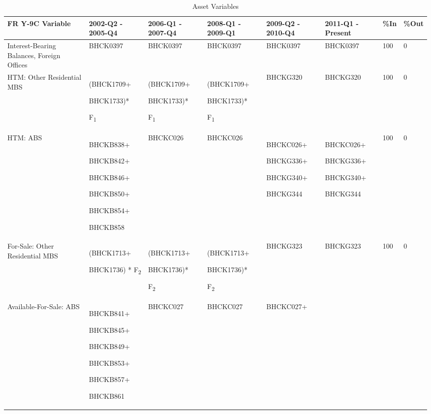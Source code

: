 \begin{landscape} %
\scriptsize
\begin{longtable}{|>{\raggedright}p{3cm}|>{\raggedright}p{2.2cm}|>{\raggedright}p{2.2cm}|>{\raggedright}p{2.2cm}|>{\raggedright}p{2.5cm}|>{\raggedright}p{2.5cm}|>{\raggedright}p{1cm}|>{\raggedright}p{1cm}|}
\caption{Asset Variables}
\label{tab:assets_y9c} \tabularnewline
\hline 
FR Y-9C Variable  & 2002-Q2 - 2005-Q4  & 2006-Q1 - 2007-Q4  & 2008-Q1 - 2009-Q1  & 2009-Q2 - 2010-Q4  & 2011-Q1 - Present  & \%In  & \%Out\tabularnewline
\endhead
\hline 
Interest-Bearing Balances, Foreign Offices  & BHCK0397  & BHCK0397  & BHCK0397  & BHCK0397  & BHCK0397  & 100  & 0\tabularnewline
\hline 
HTM: Other Residential MBS  & (BHCK1709+

BHCK1733){*}

F\textsubscript{1}  & (BHCK1709+

BHCK1733){*}

F\textsubscript{1}  & (BHCK1709+

BHCK1733){*}

F\textsubscript{1}  & BHCKG320  & BHCKG320  & 100  & 0\tabularnewline
\hline 
HTM: ABS  & BHCKB838+

BHCKB842+

BHCKB846+

BHCKB850+

BHCKB854+

BHCKB858  & BHCKC026  & BHCKC026  & BHCKC026+

BHCKG336+

BHCKG340+

BHCKG344  & BHCKC026+

BHCKG336+

BHCKG340+

BHCKG344  & 100  & 0\tabularnewline
\hline 
For-Sale: Other Residential MBS  & (BHCK1713+

BHCK1736) {*} F\textsubscript{2}  & (BHCK1713+

BHCK1736){*}

F\textsubscript{2}  & (BHCK1713+

BHCK1736){*}

F\textsubscript{2}  & BHCKG323  & BHCKG323  & 100  & 0\tabularnewline
\hline 
Available-For-Sale: ABS  & BHCKB841+

BHCKB845+

BHCKB849+

BHCKB853+

BHCKB857+

BHCKB861  & BHCKC027  & BHCKC027  & BHCKC027+


\end{longtable}
\end{landscape}
